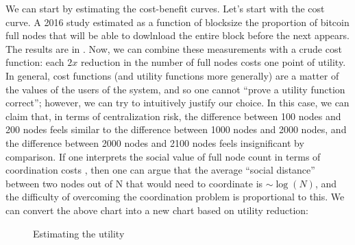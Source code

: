 \documentclass[12pt, final]{article}
\begin{document}
\begin{enumerate}
We can start by estimating the cost-benefit curves. Let's start with the cost curve. A 2016 study\cite{cornell-position} estimated as a function of blocksize the proportion of bitcoin full nodes that will be able to dowlnload the entire block before the next appears.  The results are in .  Now, we can combine these measurements with a crude cost function: each $2x$ reduction in the number of full nodes costs one point of utility. In general, cost functions (and utility functions more generally) are a matter of the values of the users of the system, and so one cannot ``prove a utility function correct''; however, we can try to intuitively justify our choice. In this case, we can claim that, in terms of centralization risk, the difference between 100 nodes and 200 nodes feels similar to the difference between 1000 nodes and 2000 nodes, and the difference between 2000 nodes and 2100 nodes feels insignificant by comparison. If one interprets the social value of full node count in terms of coordination costs \cite{vitalik-coord}, then one can argue that the average ``social distance'' between two nodes out of N that would need to coordinate is $\sim \log(N)$, and the difficulty of overcoming the coordination problem is proportional to this.  We can convert the above chart into a new chart based on utility reduction:
\end{enumerate}


\begin{figure}[hbt]
\centering
{}
\caption{Estimating the utility}
\label{fig:two}
\end{figure}
\end{document}

